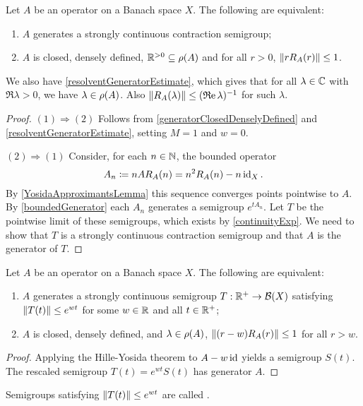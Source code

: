 \begin{theorem} \label{HilleYosidaContraction}
Let $A$ be an operator on a Banach space $X$. The following are equivalent:
\begin{enumerate}
\item $A$ generates a strongly continuous contraction semigroup;
\item $A$ is closed, densely defined, $\mathbb{R}^{>0}\subseteq \rho(A)$ and for all $r > 0$, $\lVert rR_A(r)\rVert \leq 1$.
\end{enumerate}
\end{theorem}
We also have \ref{resolventGeneratorEstimate}, which gives that for all $\lambda\in\mathbb{C}$ with $\Re\lambda >0$, we have $\lambda\in\rho(A)$. Also $\lVert R_A(\lambda)\rVert \leq (\operatorname{\mathfrak{R}e} \lambda)^{-1}$ for such $\lambda$.
\begin{proof}
$(1)\Rightarrow (2)$ Follows from \ref{generatorClosedDenselyDefined} and \ref{resolventGeneratorEstimate}, setting $M = 1$ and $w = 0$.

$(2)\Rightarrow (1)$ Consider, for each $n\in \mathbb{N}$, the bounded operator
\[ A_n \coloneqq nAR_A(n) = n^2R_A(n) - n\operatorname{id}_X. \]
By \ref{YosidaApproximantsLemma} this sequence converges points pointwise to $A$. By \ref{boundedGenerator} each $A_n$ generates a semigroup $e^{tA_n}$. Let $T$ be the pointwise limit of these semigroups, which exists by \ref{continuityExp}. We need to show that $T$ is a strongly continuous contraction semigroup and that $A$ is the generator of $T$.


\end{proof}
\begin{corollary} \label{quasiContractiveHilleYosida}
Let $A$ be an operator on a Banach space $X$. The following are equivalent:
\begin{enumerate}
\item $A$ generates a strongly continuous semigroup $T: \mathbb{R}^+\to \operatorname{\mathcal{B}}(X)$ satisfying $\lVert T(t)\rVert\leq e^{wt}$ for some $w\in \mathbb{R}$ and all $t\in\mathbb{R}^+$;
\item $A$ is closed, densely defined, and $\lambda\in  \rho(A)$, $\lVert(r-w)R_A(r)\rVert \leq 1$ for all $r>w$.
\end{enumerate}
\end{corollary}
\begin{proof}
Applying the Hille-Yosida theorem to $A-w\operatorname{id}$ yields a semigroup $S(t)$. The rescaled semigroup $T(t) = e^{wt}S(t)$ has generator $A$.
\end{proof}
Semigroups satisfying $\lVert T(t)\rVert \leq e^{wt}$ are called .

